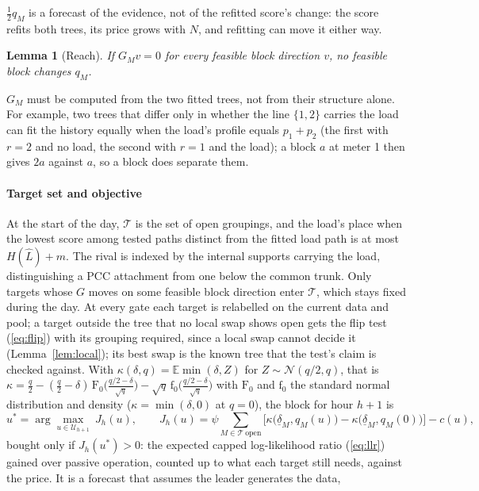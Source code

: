 \documentclass[journal,onecolumn,11pt]{IEEEtran}
\newtheorem{lemma}{Lemma}
\newcommand{\Tset}{\mathcal{T}}
\newcommand{\Uset}{\mathcal{U}}
\begin{document}
$\tfrac12q_M$ is a forecast of the evidence, not of the refitted score's change: the score refits both trees, its price grows
with $N$, and refitting can move it either way.
\begin{lemma}[Reach]\label{lem:reach}
If $G_Mv=0$ for every feasible block direction $v$, no feasible block changes $q_M$.
\end{lemma}
$G_M$ must be computed from the two fitted trees, not from their structure alone. For example, two trees that differ only in
whether the line $\{1,2\}$ carries the load can fit the history equally when the load's profile equals $p_1+p_2$ (the first
with $r=2$ and no load, the second with $r=1$ and the load); a block $a$ at meter 1 then gives $2a$ against $a$, so a block
does separate them.

\paragraph*{Target set and objective} At the start of the day, $\Tset$ is the set of open groupings, and the load's place
when the lowest score among tested paths distinct from the fitted load path is at most $H(\hat L)+m$.
The rival is indexed by the internal supports carrying the load, distinguishing a PCC attachment from one below
the common trunk. Only targets whose $G$ moves on some feasible
block direction enter $\Tset$, which stays fixed during the day. At every gate each target is relabelled on the current data and pool; a
target outside the tree that no local swap shows open gets the flip test (\ref{eq:flip}) with its grouping required, since a
local swap cannot decide it (Lemma~\ref{lem:local}); its best swap is the known tree that the test's claim is checked
against. With
$\kappa(\delta,q)=\mathbb E\min(\delta,Z)$ for $Z\sim\mathcal N(q/2,q)$, that is
$\kappa=\tfrac q2-(\tfrac q2-\delta)\,\mathrm F_0\big(\tfrac{q/2-\delta}{\sqrt q}\big)-\sqrt q\,\mathrm f_0\big(\tfrac{q/2-\delta}{\sqrt q}\big)$
with $\mathrm F_0$ and $\mathrm f_0$ the standard normal distribution and density ($\kappa=\min(\delta,0)$ at $q=0$), the
block for hour $h+1$ is
\begin{equation}\label{eq:block}
u^\ast=\arg\max_{u\in\Uset_{h+1}}\ J_h(u),\qquad
J_h(u)=\psi\sum_{M\in\Tset\ \text{open}}\Big[\kappa\big(\underline\delta_M,q_M(u)\big)-\kappa\big(\underline\delta_M,q_M(0)\big)\Big]-c(u),
\end{equation}
bought only if $J_h(u^\ast)>0$: the expected capped log-likelihood ratio (\ref{eq:llr}) gained over passive operation,
counted up to what each target still needs, against the price. It is a forecast that assumes the leader generates the data,
\end{document}
